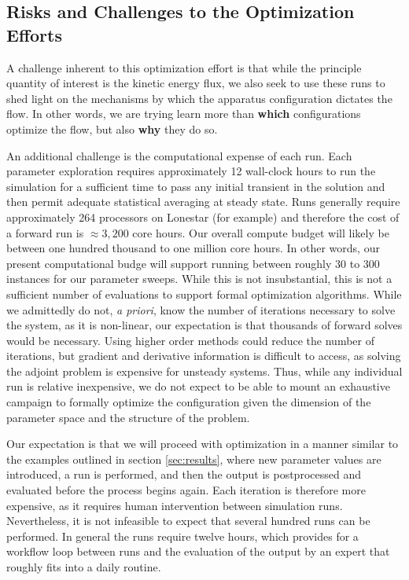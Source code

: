 \subsection{Risks and Challenges to the Optimization Efforts}

A challenge inherent to this optimization effort is that while the
principle quantity of interest is the kinetic energy flux, we also seek
to use these runs to shed light on the mechanisms by which the apparatus
configuration dictates the flow. In other words, we are trying learn
more than \textbf{which} configurations optimize the flow, but also 
\textbf{why} they do so. 


%
%
An additional challenge is the computational expense of each run. Each
parameter exploration requires approximately 12 wall-clock hours to run
the simulation for a sufficient time to pass any initial transient in
the solution and then permit adequate statistical averaging at steady
state. Runs generally require approximately 264 processors on Lonestar
(for example) and therefore the cost of a forward run is $\approx 3,200$
core hours. Our overall compute budget will likely be between one hundred
thousand to one million core hours. In other words, our present
computational budge will support running between roughly 30 to 300
instances for our parameter sweeps. While this is not insubstantial, this
is not a sufficient number of evaluations to support formal
optimization algorithms. While we admittedly do not, \textit{a priori},
know the number of iterations necessary to solve the system, as it is
non-linear, our expectation is that thousands of forward solves would be
necessary. Using higher order methods could reduce the number of
iterations, but gradient and derivative information is difficult to
access, as solving the adjoint problem is expensive for unsteady systems. 
Thus, while any individual run is relative inexpensive, we do not expect
to be able to mount an exhaustive campaign to formally optimize the
configuration given the dimension of the parameter space and the
structure of the problem. 

%
%
Our expectation is that we will proceed with optimization in a manner
similar to the examples outlined in section \ref{sec:results}, where new
parameter values are introduced, a run is performed, and then the output
is postprocessed and evaluated before the process begins again. Each
iteration is therefore more expensive, as it requires human
intervention between simulation runs. Nevertheless, it is not infeasible
to expect that several hundred runs can be performed. In general the
runs require twelve hours, which provides for a workflow loop between
runs and the evaluation of the output by an expert that roughly fits
into a daily routine.

